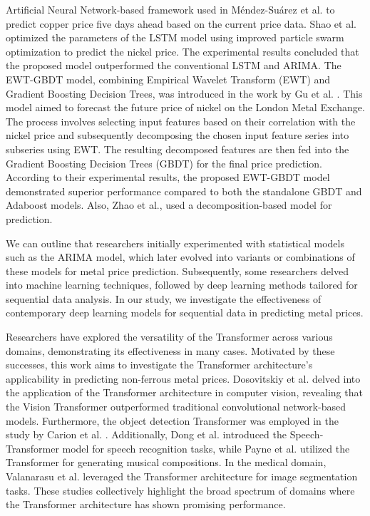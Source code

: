 \documentclass[preprint,12pt]{elsarticle}
\begin{document}
\par Artificial Neural Network-based framework used in M{\'e}ndez-Su{\'a}rez et al.\cite{mendez2019artificial} to predict copper price five days ahead based on the current price data. Shao et al. \cite{shao2019nickel} optimized the parameters of the LSTM model using improved particle swarm optimization to predict the nickel price. The experimental results concluded that the proposed model outperformed the conventional LSTM and ARIMA. The EWT-GBDT model, combining Empirical Wavelet Transform (EWT) and Gradient Boosting Decision Trees, was introduced in the work by Gu et al. \cite{gu2021forecasting}. This model aimed to forecast the future price of nickel on the London Metal Exchange. The process involves selecting input features based on their correlation with the nickel price and subsequently decomposing the chosen input feature series into subseries using EWT. The resulting decomposed features are then fed into the Gradient Boosting Decision Trees (GBDT) for the final price prediction. According to their experimental results, the proposed EWT-GBDT model demonstrated superior performance compared to both the standalone GBDT and Adaboost models. Also, Zhao et al.\cite{zhao2022risk}, used a decomposition-based model for prediction.
\par We can outline that researchers initially experimented with statistical models such as the ARIMA model, which later evolved into variants or combinations of these models for metal price prediction. Subsequently, some researchers delved into machine learning techniques, followed by deep learning methods tailored for sequential data analysis. In our study, we investigate the effectiveness of contemporary deep learning models for sequential data in predicting metal prices.
\par Researchers have explored the versatility of the Transformer across various domains, demonstrating its effectiveness in many cases. Motivated by these successes, this work aims to investigate the Transformer architecture's applicability in predicting non-ferrous metal prices. Dosovitskiy et al. \cite{dosovitskiy2020image} delved into the application of the Transformer architecture in computer vision, revealing that the Vision Transformer outperformed traditional convolutional network-based models. Furthermore, the object detection Transformer was employed in the study by Carion et al. \cite{carion2020end}. Additionally, Dong et al. \cite{dong2018speech} introduced the Speech-Transformer model for speech recognition tasks, while Payne et al. \cite{payne2019musenet} utilized the Transformer for generating musical compositions. In the medical domain, Valanarasu et al. \cite{valanarasu2021medical} leveraged the Transformer architecture for image segmentation tasks. These studies collectively highlight the broad spectrum of domains where the Transformer architecture has shown promising performance.
\end{document}
